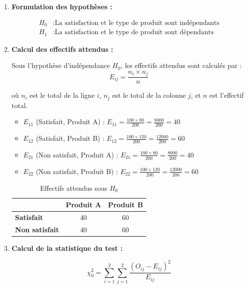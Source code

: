 \documentclass[11pt,a4paper]{article}
\newcommand{\chideux}{\chi^2}
\begin{document}
\begin{enumerate}
    \item \textbf{Formulation des hypothèses :}
    
    \begin{align}
    H_0 &: \text{La satisfaction et le type de produit sont indépendants} \\
    H_1 &: \text{La satisfaction et le type de produit sont dépendants}
    \end{align}
    
    \item \textbf{Calcul des effectifs attendus :}
    
    Sous l'hypothèse d'indépendance $H_0$, les effectifs attendus sont calculés par :
    $$E_{ij} = \frac{n_i \times n_j}{n}$$
    
    où $n_i$ est le total de la ligne $i$, $n_j$ est le total de la colonne $j$, et $n$ est l'effectif total.
    
    \begin{itemize}
        \item $E_{11}$ (Satisfait, Produit A) : $E_{11} = \frac{100 \times 80}{200} = \frac{8000}{200} = 40$
        \item $E_{12}$ (Satisfait, Produit B) : $E_{12} = \frac{100 \times 120}{200} = \frac{12000}{200} = 60$
        \item $E_{21}$ (Non satisfait, Produit A) : $E_{21} = \frac{100 \times 80}{200} = \frac{8000}{200} = 40$
        \item $E_{22}$ (Non satisfait, Produit B) : $E_{22} = \frac{100 \times 120}{200} = \frac{12000}{200} = 60$
    \end{itemize}
    
    \begin{table}[h]
    \centering
    \begin{tabular}{|l|c|c|}
    \hline
     & \textbf{Produit A} & \textbf{Produit B} \\
    \hline
    \textbf{Satisfait} & 40 & 60 \\
    \hline
    \textbf{Non satisfait} & 40 & 60 \\
    \hline
    \end{tabular}
    \caption{Effectifs attendus sous $H_0$}
    \end{table}
    
    \item \textbf{Calcul de la statistique du test :}
    
    $$\chideux_0 = \sum_{i=1}^{2} \sum_{j=1}^{2} \frac{(O_{ij} - E_{ij})^2}{E_{ij}}$$
    

\end{enumerate}
\end{document}
